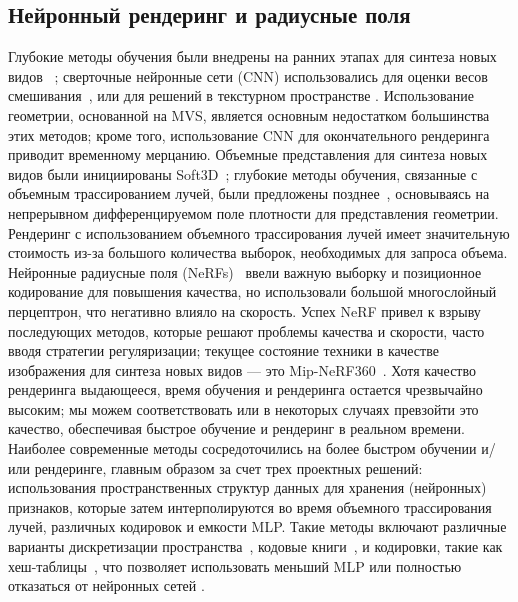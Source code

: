 \subsection{Нейронный рендеринг и радиусные поля}
Глубокие методы обучения были внедрены на ранних этапах для синтеза новых видов ~\cite{zhou2016view, flynn2016deepstereo}; сверточные нейронные сети (CNN) использовались для оценки весов смешивания~\cite{hedman2018deep}, или для решений в текстурном пространстве \cite{thies2019deferred,riegler2020free}. Использование геометрии, основанной на MVS, является основным недостатком большинства этих методов; кроме того, использование CNN для окончательного рендеринга  приводит  временному мерцанию.
Объемные представления для синтеза новых видов были инициированы Soft3D~\cite{penner2017soft}; глубокие методы обучения, связанные с объемным трассированием лучей, были предложены позднее~\cite{sitzmann2019deepvoxels,henzler2019escaping}, основываясь на непрерывном дифференцируемом поле плотности для представления геометрии. Рендеринг с использованием объемного трассирования лучей имеет значительную стоимость из-за большого количества выборок, необходимых для запроса объема. Нейронные радиусные поля (NeRFs)~\cite{mildenhall2020nerf} ввели важную выборку и позиционное кодирование для повышения качества, но использовали большой многослойный перцептрон, что негативно влияло на скорость.
Успех NeRF привел к взрыву последующих методов, которые решают проблемы качества и скорости, часто вводя стратегии регуляризации; текущее состояние техники в качестве изображения для синтеза новых видов — это Mip-NeRF360~\cite{barron2022mipnerf360}. Хотя качество рендеринга выдающееся, время обучения и рендеринга остается чрезвычайно высоким; мы можем соответствовать или в некоторых случаях превзойти это качество, обеспечивая быстрое обучение и рендеринг в реальном времени.
Наиболее современные методы сосредоточились на более быстром обучении и/или рендеринге, главным образом за счет трех проектных решений: использования пространственных структур данных для хранения (нейронных) признаков, которые затем интерполируются во время объемного трассирования лучей, различных кодировок и емкости MLP. Такие методы включают
различные варианты дискретизации пространства~\cite{nglod-cvpr2021,plenoxels,yu2021plenoctrees,hedman2021snerg,chen2022mobilenerf,garbin2021fastnerf,Reiser2021ICCV,tensorf-eccv2022,wu2022snisr},
кодовые книги~\cite{takikawa2022variable},
и кодировки, такие как хеш-таблицы~\cite{mueller2022instant}, что позволяет использовать меньший MLP или полностью отказаться от нейронных сетей \cite{plenoxels,dvgo-cvpr2022}. %
